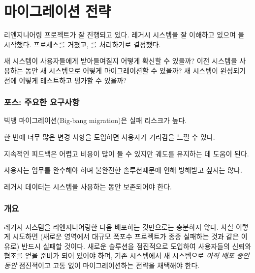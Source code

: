 \documentclass[a4paper,10pt,twoside]{book}
\begin{document}
	\renewcommand{\nnbb}[2]{} %
	\sloppy
\fi
\chapter{마이그레이션 전략}


\label{pat:AlwaysHaveARunningVersion}

리엔지니어링 프로젝트가 잘 진행되고 있다. 레거시 시스템을 잘 이해하고 있으며 을 시작했다.  프로세스를 거쳤고, 를 처리하기로 결정했다.

새 시스템이 사용자들에게 받아들여질지 어떻게 확신할 수 있을까? 이전 시스템을 사용하는 동안 새 시스템으로 어떻게 마이그레이션할 수 있을까? 새 시스템이 완성되기 전에 어떻게 테스트하고 평가할 수 있을까?

\subsection*{포스: 주요한 요구사항}

\begin{bulletlist}
\item 빅뱅 마이그레이션(Big-bang migration)은 실패 리스크가 높다.

\item 한 번에 너무 많은 변경 사항을 도입하면 사용자가 거리감을 느낄 수 있다.

\item 지속적인 피드백은 어렵고 비용이 많이 들 수 있지만 궤도를 유지하는 데 도움이 된다.

\item 사용자는 업무를 완수해야 하며 불완전한 솔루션때문에 인해 방해받고 싶지는 않다.

\item 레거시 데이터는 시스템을 사용하는 동안 보존되어야 한다.
\end{bulletlist}

\subsection*{개요}

레거시 시스템을 리엔지니어링한 다음 배포하는 것만으로는 충분하지 않다. 사실 이렇게 시도하면 (새로운 영역에서 대규모 폭포수 프로젝트가 종종 실패하는 것과 같은 이유로) 반드시 실패할 것이다. 새로운 솔루션을 점진적으로 도입하여 사용자들의 신뢰와 협조를 얻을 준비가 되어 있어야 하며, 기존 시스템에서 새 시스템으로 \emph{아직 배포 중인 동안} 점진적이고 고통 없이 마이그레이션하는 전략을 채택해야 한다.
\end{document}
